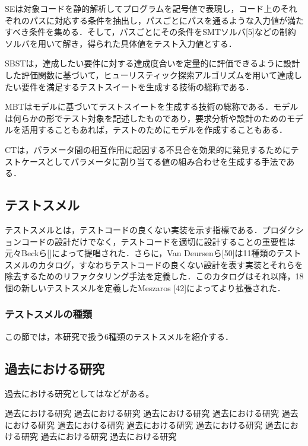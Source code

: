 \documentclass[12pt]{jarticle} %
\begin{document}
SEは対象コードを静的解析してプログラムを記号値で表現し，コード上のそれぞれのパスに対応する条件を抽出し，パスごとにパスを通るような入力値が満たすべき条件を集める．そして，パスごとにその条件をSMTソルバ[5]などの制約ソルバを用いて解き，得られた具体値をテスト入力値とする．

SBSTは，達成したい要件に対する達成度合いを定量的に評価できるように設計した評価関数に基づいて，ヒューリスティック探索アルゴリズムを用いて達成したい要件を満足するテストスイートを生成する技術の総称である．

MBTはモデルに基づいてテストスイートを生成する技術の総称である．モデルは何らかの形でテスト対象を記述したものであり，要求分析や設計のためのモデルを活用することもあれば，テストのためにモデルを作成することもある．

CTは，パラメータ間の相互作用に起因する不具合を効果的に発見するためにテストケースとしてパラメータに割り当てる値の組み合わせを生成する手法である．

\subsection{テストスメル}

テストスメルとは，テストコードの良くない実装を示す指標である．プロダクションコードの設計だけでなく，テストコードを適切に設計することの重要性は元々Beckら[]によって提唱された．さらに，Van Deursenら[50]は11種類のテストスメルのカタログ，すなわちテストコードの良くない設計を表す実装とそれらを除去するためのリファクタリング手法を定義した．このカタログはそれ以降，18個の新しいテストスメルを定義したMeszaros [42]によってより拡張された．

\subsubsection{テストスメルの種類}
この節では，本研究で扱う6種類のテストスメルを紹介する．





\subsection{過去における研究}
\label{kako}


過去における研究としては\cite{alex_nips12}などがある。

過去における研究 過去における研究 過去における研究 
過去における研究 過去における研究 過去における研究 過去における研究 
過去における研究 過去における研究 過去における研究 過去における研究 
\end{document}
